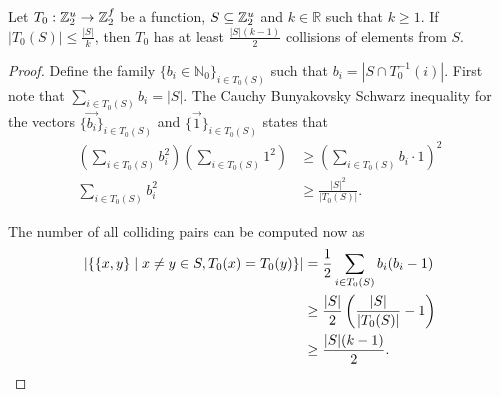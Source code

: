 \begin{lemma}
\label{lemma-collision-count}
Let $T_0: \mathbb{Z}_{2}^{u} \rightarrow \mathbb{Z}_{2}^{f}$ be a function, $S \subseteq \mathbb{Z}_{2}^{u}$ and $k \in \mathbb{R}$ such that $k \geq 1$. If $|T_0(S)| \leq \frac{|S|}{k}$, then $T_0$ has at least $\frac{|S|(k - 1)}{2}$ collisions of elements from $S$.
\end{lemma} 
\begin{proof}
Define the family $\{b_i \in \mathbb{N}_0\}_{i \in T_0(S)}$ such that $b_i = \left|S \cap T_0^{-1}(i)\right|$. First note that $\sum_{i \in T_0(S)} b_i = |S|$. The Cauchy Bunyakovsky Schwarz inequality for the vectors $\{\vec{b_i}\}_{i \in T_0(S)}$ and $\{\vec{1}\}_{i \in T_0(S)}$ states that
\[
\begin{split}
\displaystyle \left(\sum_{i \in T_0(S)} b_i ^ 2\right)\left(\sum_{i \in T_0(S)} 1 ^ 2\right) &\geq \left(\sum_{i \in T_0(S)} b_i \cdot 1 \right) ^ 2 \\ 
\displaystyle \sum_{i \in T_0(S)} b_i ^ 2 & \geq \frac{|S| ^ 2}{|T_0(S)|} \text{.}
\end{split}
\]

The number of all colliding pairs can be computed now as
\[
\begin{split}
|\{ \{x, y\} \mid x \neq y \in S, T_0(x) = T_0(y) \}| 
	& = \frac{1}{2} \sum_{i \in T_0(S)} b_i (b_i - 1) \\ 
	& \geq \frac{|S|}{2}\left(\frac{|S|}{|T_0(S)|} - 1\right) \\
	& \geq \frac{|S|(k - 1)}{2} \text{.}
\end{split}
\]
\end{proof}

